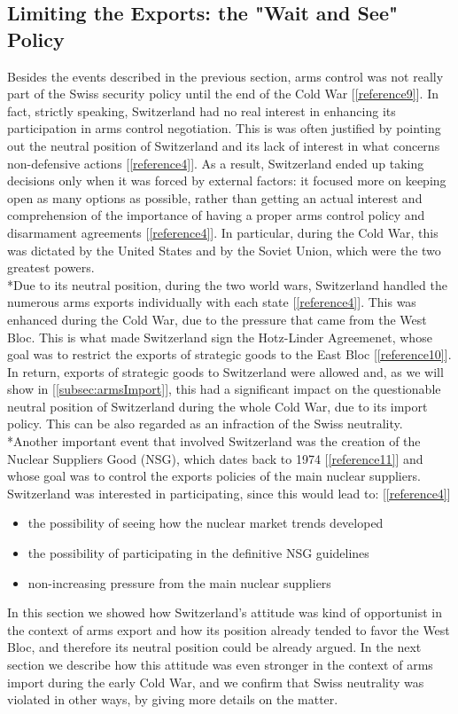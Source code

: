 \documentclass[a4paper]{article}
\begin{document}
\subsection{Limiting the Exports: the "Wait and See" Policy}
Besides the events described in the previous section, arms control was not really part of the Swiss security policy until the end of the Cold War [\ref{reference9}]. In fact, strictly speaking, Switzerland had no real interest in enhancing its participation in arms control negotiation. This is was often justified by pointing out the neutral position of Switzerland and its lack of interest in what concerns non-defensive actions [\ref{reference4}]. As a result, Switzerland ended up taking decisions only when it was forced by external factors: it focused more on keeping open as many options as possible, rather than getting an actual interest and comprehension of the importance of having a proper arms control policy and disarmament agreements [\ref{reference4}]. In particular, during the Cold War, this was dictated by the United States and by the Soviet Union, which were the two greatest powers.
\\*Due to its neutral position, during the two world wars, Switzerland handled the numerous arms exports individually with each state [\ref{reference4}]. This was enhanced during the Cold War, due to the pressure that came from the West Bloc. This is what made Switzerland sign the Hotz-Linder Agreemenet, whose goal was to restrict the exports of strategic goods to the East Bloc [\ref{reference10}]. In return, exports of strategic goods to Switzerland were allowed and, as we will show in [\ref{subsec:armsImport}], this had a significant impact on the questionable neutral position of Switzerland during the whole Cold War, due to its import policy. This can be also regarded as an infraction of the Swiss neutrality. \\*Another important event that involved Switzerland was the creation of the Nuclear Suppliers Good (NSG), which dates back to 1974 [\ref{reference11}] and whose goal was to control the exports policies of the main nuclear suppliers. Switzerland was interested in participating, since this would lead to: [\ref{reference4}] 
\begin{itemize}
\item{the possibility of seeing how the nuclear market trends developed}
\item{the possibility of participating in the definitive NSG guidelines}
\item{non-increasing pressure from the main nuclear suppliers}
\end{itemize}
In this section we showed how Switzerland's attitude was kind of opportunist in the context of arms export and how its position already tended to favor the West Bloc, and therefore its neutral position could be already argued. In the next section we describe how this attitude was even stronger in the context of arms import during the early Cold War, and we confirm that Swiss neutrality was violated in other ways, by giving more details on the matter.
\end{document}
